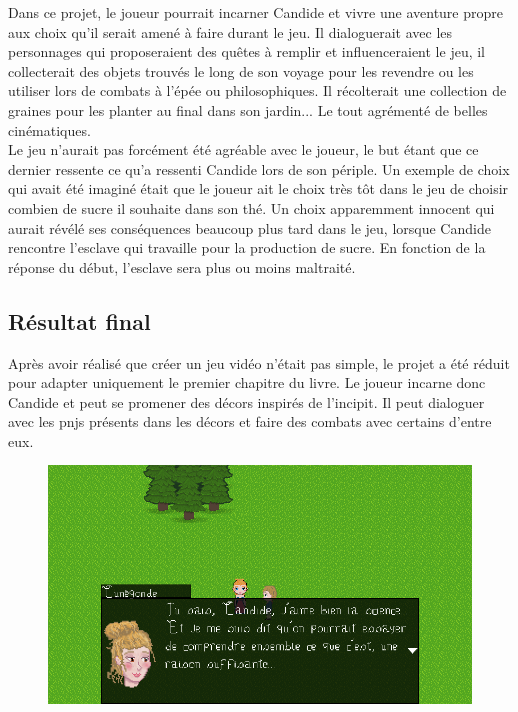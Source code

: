 \documentclass[11pt]{article}
\begin{document}
Dans ce projet, le joueur pourrait incarner Candide et vivre une aventure propre aux choix qu'il serait amené à faire durant le jeu. Il dialoguerait avec les personnages qui proposeraient des quêtes à remplir et influenceraient le jeu, il collecterait des objets trouvés le long de son voyage pour les revendre ou les utiliser lors de combats à l'épée ou philosophiques. Il récolterait une collection de graines pour les planter au final dans son jardin... Le tout agrémenté de belles cinématiques.\\ Le jeu n'aurait pas forcément été agréable avec le joueur, le but étant que ce dernier ressente ce qu'a ressenti Candide lors de son périple. Un exemple de choix qui avait été imaginé était  que le joueur ait le choix très tôt dans le jeu de choisir combien de sucre il souhaite dans son thé. Un choix apparemment innocent qui aurait révélé ses conséquences beaucoup plus tard dans le jeu, lorsque Candide rencontre l'esclave qui travaille pour la production de sucre. En fonction de la réponse du début, l'esclave sera plus ou moins maltraité. 


\subsection{Résultat final}
Après avoir réalisé que créer un jeu vidéo n'était pas simple, le projet a été réduit pour adapter uniquement le premier chapitre du livre. 
Le joueur incarne donc Candide et peut se promener des décors inspirés de l'incipit. Il peut dialoguer avec les pnjs présents dans les décors et faire des combats avec certains d'entre eux.
\begin{figure}[H]
\includegraphics[scale=0.33]{cunegondeScn}
\centering
\end{figure}
\end{document}
